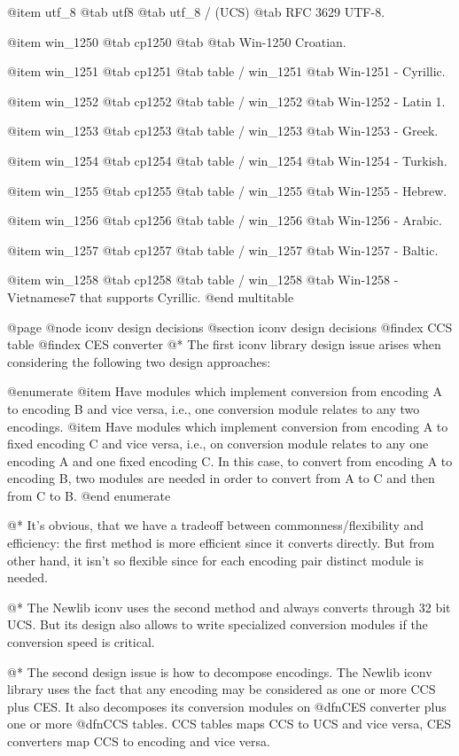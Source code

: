 @item
utf_8
@tab
utf8
@tab
utf_8 / (UCS)
@tab
RFC 3629 UTF-8.


@item
win_1250
@tab
cp1250
@tab
@tab
Win-1250 Croatian.


@item
win_1251
@tab
cp1251
@tab
table / win_1251
@tab
Win-1251 - Cyrillic.


@item
win_1252
@tab
cp1252
@tab
table / win_1252
@tab
Win-1252 - Latin 1.


@item
win_1253
@tab
cp1253
@tab
table / win_1253
@tab
Win-1253 - Greek.


@item
win_1254
@tab
cp1254
@tab
table / win_1254
@tab
Win-1254 - Turkish.


@item
win_1255
@tab
cp1255
@tab
table / win_1255
@tab
Win-1255 - Hebrew.


@item
win_1256
@tab
cp1256
@tab
table / win_1256
@tab
Win-1256 - Arabic.


@item
win_1257
@tab
cp1257
@tab
table / win_1257
@tab
Win-1257 - Baltic.


@item
win_1258
@tab
cp1258
@tab
table / win_1258
@tab
Win-1258 - Vietnamese7 that supports Cyrillic.
@end multitable




@page
@node iconv design decisions
@section iconv design decisions
@findex CCS table
@findex CES converter
@*
The first iconv library design issue arises when considering the
following two design approaches:

@enumerate
@item
Have modules which implement conversion from encoding A to encoding B
and vice versa, i.e., one conversion module relates to any two
encodings.
@item
Have modules which implement conversion from encoding A to fixed
encoding C and vice versa, i.e., on conversion module relates to any
one encoding A and one fixed encoding C. In this case, to convert from
encoding A to encoding B, two modules are needed in order to convert
from A to C and then from C to B.
@end enumerate

@*
It's obvious, that we have a tradeoff between commonness/flexibility and
efficiency: the first method is more efficient since it converts
directly. But from other hand, it isn't so flexible since for each
encoding pair distinct module is needed.

@*
The Newlib iconv uses the second method and always converts through 32
bit UCS. But its design also allows to write specialized conversion
modules if the conversion speed is critical.

@*
The second design issue is how to decompose encodings.
The Newlib iconv library uses the fact that any encoding may be
considered as one or more CCS plus CES. It also decomposes its
conversion modules on @dfn{CES converter} plus one or more @dfn{CCS
tables}. CCS tables maps CCS to UCS and vice versa, CES converters
map CCS to encoding and vice versa.

